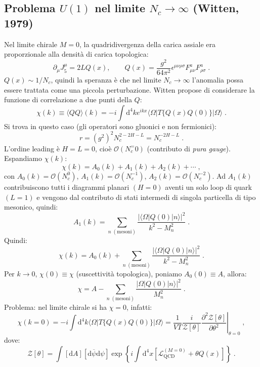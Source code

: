 \documentclass[12pt,a4paper]{article}
\theoremstyle{definition}
\newcommand{\pdev}[3][]{\frac{\partial^{#1} #2}{\partial #3^{#1}}}
\newcommand{\lag}{\mathcal{L}}
\newcommand{\diff}[1][]{\mathrm{d}#1}
\newcommand{\bra}{\langle}
\newcommand{\ket}{\rangle}
\newcommand{\zpart}{\mathcal{Z}}
\numberwithin{equation}{section}
\begin{document}
\subsection{Problema $U(1)$ nel limite $N_c\to\infty$ (Witten, 1979)}
Nel limite chirale $M=0$, la quadridivergenza della carica assiale era proporzionale alla densità di carica topologica:
$$
\partial_{\mu}J^{\mu}_5=2LQ(x),\qquad Q(x)=\frac{g^2}{64\pi^2}\epsilon^{\mu\nu\rho\sigma}F^a_{\mu\nu}F^a_{\rho\sigma}\;.
$$
$Q(x)\sim 1/N_c$, quindi la speranza è che nel limite $N_c\to\infty$ l'anomalia possa essere trattata come una piccola perturbazione. Witten propose di considerare la funzione di correlazione a due punti della $Q$:
\begin{equation}
\chi(k)\equiv\bra QQ\ket(k)=-i\int\diff^4{k}e^{ikx}\bra\Omega|T\{Q(x)Q(0)\}|\Omega\ket\;.
\end{equation}
Si trova in questo caso (gli operatori sono gluonici e non fermionici):
$$
r=(g^2)^2N_c^{2-2H-L}=N_c^{-2H-L}\;.
$$
L'ordine leading è $H=L=0$, cioè $\mathcal{O}(N_c^=0)$ (contributo di \emph{pura gauge}). Espandiamo $\chi(k)$:
\begin{equation}
\chi(k)=A_0(k)+A_1(k)+A_2(k)+\cdots\;,
\end{equation}
con $A_0(k)=\mathcal{O}(N_c^0)$, $A_1(k)=\mathcal{O}(N_c^{-1})$, $A_2(k)=\mathcal{O}(N_c^{-2})$. Ad $A_1(k)$ contribuiscono tutti i diagrammi planari $(H=0)$ aventi un solo loop di quark $(L=1)$ e vengono dal contributo di stati intermedi di singola particella di tipo mesonico, quindi:
\begin{equation}
\boxed{
A_1(k)=\sum_{n\;\mathrm{(mesoni)}}\frac{|\bra\Omega|Q(0)|n\ket|^2}{k^2-M_n^2}
}\;.
\end{equation}
Quindi:
$$
\chi(k)=A_0(k)+\sum_{n\;\mathrm{(mesoni)}}\frac{|\bra\Omega|Q(0)|n\ket|^2}{k^2-M_n^2}\;.
$$
Per $k\to 0$, $\chi(0)\equiv\chi$ (suscettività topologica), poniamo $A_0(0)\equiv A$, allora:
\begin{equation}
\chi=A-\sum_{n\;(\mathrm{mesoni})}\frac{|\Omega|Q(0)|n\ket|^2}{M_n^2}\;.
\end{equation}
Problema: nel limite chirale si ha $\chi=0$, infatti:
\begin{equation}
\chi(k=0)=-i\int\diff^4{k}\bra\Omega|T\{Q(x)Q(0)\}|\Omega\ket=\frac{1}{VT}\frac{i}{\zpart[\theta]}\left.\pdev[2]{\zpart[\theta]}{\theta}\right|_{\theta=0}\;,
\end{equation}
dove:
\begin{equation}
\zpart[\theta]=\int[\diff{A}][\diff{\overline{\psi}}\diff{\psi}]\exp\left\{i\int\diff^4{x}\left[\lag_{\mathrm{QCD}}^{(M=0)}+\theta Q(x)\right]\right\}\;.
\end{equation}
\end{document}

